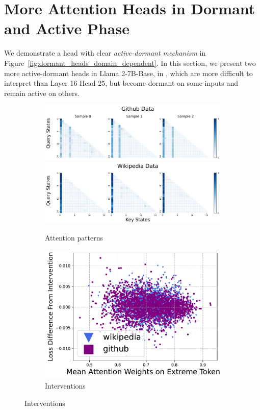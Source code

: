 \section{More Attention Heads in Dormant and Active Phase}\label{sec:more_heads}
We demonstrate a head with clear \textit{active-dormant mechanism} in Figure~\ref{fig:dormant_heads_domain_dependent}. 
In this section, we present two more active-dormant heads in Llama 2-7B-Base, in , which are more difficult to interpret than Layer 16 Head 25, but become dormant on some inputs and remain active on others. 

\begin{figure}[h]
    \centering
    \begin{subfigure}{0.575\textwidth}
        \centering 
        \caption{Attention patterns}
        \includegraphics[width=\linewidth]{Figures/L16H20/attn_github_head20.png}
        \includegraphics[width=\linewidth]{Figures/L16H20/attn_wikipedia_head20.png}
    \end{subfigure}
    \hfill
    \begin{subfigure}{0.4\textwidth}
        \centering
        \caption{Interventions}
        \includegraphics[width=\linewidth]{Figures/L16H20/L16H20.pdf}

\end{subfigure}
\end{figure}
